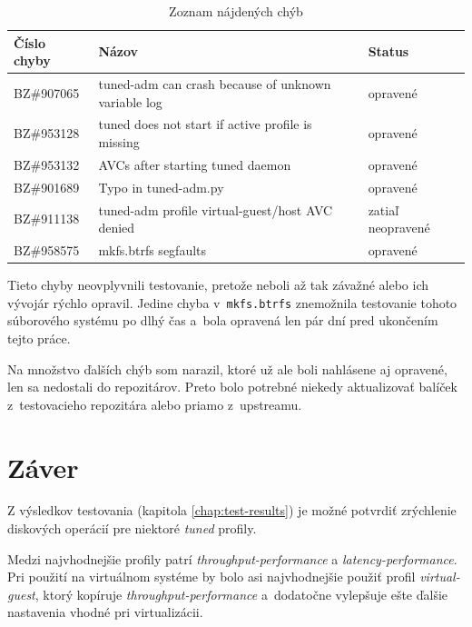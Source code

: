 \begin{table}[H]
\begin{center}
\begin{tabular}{|l|l|l|}
    \hline
    \textbf{Číslo chyby} & \textbf{Názov} & \textbf{Status} \\
    \hline
    BZ\#907065 & tuned-adm can crash because of unknown variable log & opravené \\
    BZ\#953128 & tuned does not start if active profile is missing & opravené \\
    BZ\#953132 & AVCs after starting tuned daemon & opravené \\
    BZ\#901689 & Typo in tuned-adm.py & opravené \\
    BZ\#911138 & tuned-adm profile virtual-guest/host AVC denied & zatiaľ neopravené \\
    BZ\#958575 & mkfs.btrfs segfaults & opravené \\
    \hline
\end{tabular}
\caption{Zoznam nájdených chýb}
\label{tab:bugs}
\end{center}
\end{table}

Tieto chyby neovplyvnili testovanie, pretože neboli až tak závažné alebo ich
vývojár rýchlo opravil. Jedine chyba v~\texttt{mkfs.btrfs} znemožnila
testovanie tohoto súborového systému po dlhý čas a~bola opravená len pár dní
pred ukončením tejto práce.

Na množstvo ďalších chýb som narazil, ktoré už ale boli nahlásene aj opravené,
len sa nedostali do repozitárov. Preto bolo potrebné niekedy aktualizovať
balíček z~testovacieho repozitára alebo priamo z~upstreamu.


%
%

\chapter{Záver}

Z výsledkov testovania (kapitola \ref{chap:test-results}) je možné potvrdiť
zrýchlenie diskových operácií pre niektoré \emph{tuned} profily. 

Medzi najvhodnejšie profily patrí \emph{throughput-performance} a
\emph{latency-performance}. Pri použití na virtuálnom systéme by bolo asi
najvhodnejšie použiť profil \emph{virtual-guest},  ktorý kopíruje
\emph{throughput-performance} a~dodatočne vylepšuje ešte ďalšie nastavenia
vhodné pri virtualizácii.

%
%

